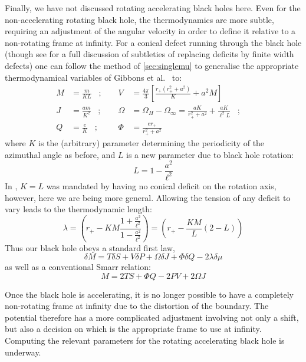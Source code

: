 \documentclass[
twoside,
openright,
frontopenright
]{dmathesis}
\begin{document}
Finally, we have not discussed rotating accelerating black holes here. Even for
the non-accelerating rotating black hole, the thermodynamics are more subtle,
requiring an adjustment of the angular velocity \cite{Gibbons:2004ai} in order
to define it relative to a non-rotating frame at infinity. For a conical defect
running through the black hole (though see
\cite{Gregory:2013xca,Gregory:2014uca} for a full discussion of subtleties of
replacing deficits by finite width defects) one can follow the method of
\cref{sec:singlemu} to generalise the appropriate thermodynamical variables of
Gibbons et al.\ \cite{Gibbons:2004ai} to:
\begin{equation}
  \begin{aligned}
M &= \frac{m}{KL} \;\;\;; \;\;\;\;&
V &= \frac{4\pi}{3} \left [ \frac{r_+(r_+^2+a^2)}{K} + a^2 M \right]\\
J &= \frac{am}{K^2} \;\;\;; \;\;\;\;&
\Omega &= \Omega_H-\Omega_\infty
= \frac{aK}{r_+^2+a^2} + \frac{aK}{\ell^2 L} \;\;\;; \;\;\;\;\\
Q &= \frac{e}{K} \;\;\;;\;\;\;\;& \Phi &= \frac{er_+}{r_+^2+a^2}
\end{aligned}
\end{equation}
where $K$ is the (arbitrary) parameter determining the periodicity of the
azimuthal angle as before, and $L$ is a new parameter due to black hole
rotation:
\begin{equation}
L = 1 - \frac{a^2}{\ell^2}
\end{equation}
In \cite{Gibbons:2004ai}, $K=L$ was mandated by having no conical deficit on the
rotation axis, however, here we are being more general. Allowing the tension of
any deficit to vary leads to the thermodynamic length:
\begin{equation}
\lambda = \left ( r_+ - KM \frac{1+\frac{a^2}{\ell^2}}{1-\frac{a^2}{\ell^2}} \right)
= \left ( r_+ - \frac{KM}{L}(2-L) \right)
\end{equation}
Thus our black hole obeys a standard first law, 
\begin{equation}
\delta M = T \delta S + V \delta P + \Omega \delta J + \Phi \delta Q
-2 \lambda \delta\mu
\end{equation}
as well as a conventional Smarr relation:
\begin{equation}
M
= 2TS + \Phi Q - 2 PV + 2 \Omega J
\end{equation}

Once the black hole is accelerating, it is no longer possible to have a
completely non-rotating frame at infinity due to the distortion of the
boundary. The potential therefore has a more complicated adjustment involving
not only a shift, but also a decision on which is the appropriate frame to use
at infinity. Computing the relevant parameters for the rotating accelerating
black hole is underway.
\end{document}
